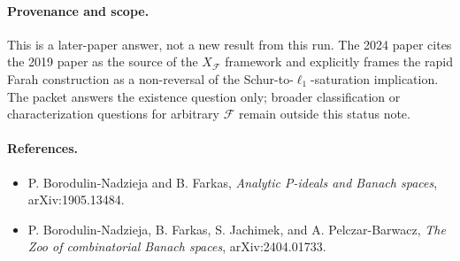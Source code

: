 \documentclass[11pt]{article}
\begin{document}
\paragraph{Provenance and scope.}
This is a later-paper answer, not a new result from this run. The 2024 paper cites the 2019 paper as the source of the \(X_{\mathcal F}\) framework and explicitly frames the rapid Farah construction as a non-reversal of the Schur-to-\(\ell_1\)-saturation implication. The packet answers the existence question only; broader classification or characterization questions for arbitrary \(\mathcal F\) remain outside this status note.

\paragraph{References.}
\begin{itemize}
\item P. Borodulin-Nadzieja and B. Farkas, \emph{Analytic P-ideals and Banach spaces}, arXiv:1905.13484.
\item P. Borodulin-Nadzieja, B. Farkas, S. Jachimek, and A. Pelczar-Barwacz, \emph{The Zoo of combinatorial Banach spaces}, arXiv:2404.01733.
\end{itemize}
\end{document}
